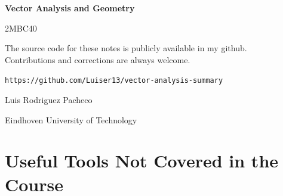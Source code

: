 \documentclass[11pt]{report}
\theoremstyle{definition}
\theoremstyle{plain}
\theoremstyle{remark}
\begin{document}
\begin{titlepage}
    \centering
    \vspace*{2.8cm}

    {\Huge\bfseries Vector Analysis and Geometry\par}
    \vspace{0.25cm}
    {\huge 2MBC40\par}
    
    \vspace{0.9cm}


    \vspace{2.2cm}



    \vfill

    \centering
    The source code for these notes is publicly available in my github.\\ Contributions and corrections are always welcome.

    \vspace{0.5em}
    \texttt{https://github.com/Luiser13/vector-analysis-summary}\\
    

    \vspace{0.5em}
    {\normalsize Luis Rodriguez Pacheco\par}
    {\normalsize Eindhoven University of Technology\par}
\end{titlepage}

\tableofcontents
\clearpage

\chapter*{Useful Tools Not Covered in the Course}
\end{document}
